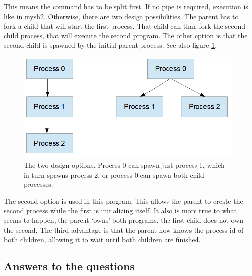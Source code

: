 \documentclass[a4paper]{article}
\begin{document}
This means the command has to be split first. If no pipe is required, execution is like in
mysh2. Otherwise, there are two design possibilities. The parent has to fork a child that 
will start the first process. That child can than fork the second child process, that
will execute the second program. The other option is that the second child is spawned by
the initial parent process. See also figure \ref{tree}.

\begin{figure}
    \includegraphics[scale=.5]{img/tree.png}
    \caption{The two design options. Process 0 can spawn just process 1, which in turn 
        spawns process 2, or process 0 can spawn both child processes.}
    \label{tree}
\end{figure}

The second option is used in this program. This allows the parent to create the second
process while the first is initializing itself. It also is more true to what seems to 
happen, the parent `owns' both programs, the first child does not own the second. The 
third advantage is that the parent now knows the process id of both children, allowing it
to wait until both children are finished.

\subsection{Answers to the questions}
\end{document}
